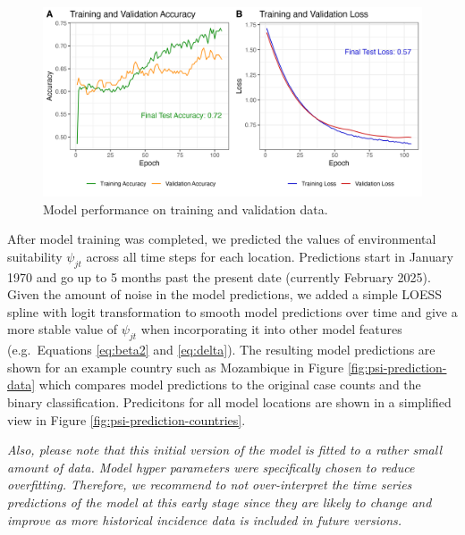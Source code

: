\documentclass[
]{book}
\begin{document}
\begin{figure}

{\centering \includegraphics[width=1\linewidth]{figures/suitability_LSTM_fit} 

}

\caption{Model performance on training and validation data.}\label{fig:lstm-model-fit}
\end{figure}

After model training was completed, we predicted the values of environmental suitability \(\psi_{jt}\) across all time steps for each location. Predictions start in January 1970 and go up to 5 months past the present date (currently February 2025). Given the amount of noise in the model predictions, we added a simple LOESS spline with logit transformation to smooth model predictions over time and give a more stable value of \(\psi_{jt}\) when incorporating it into other model features (e.g.~Equations \eqref{eq:beta2} and \eqref{eq:delta}). The resulting model predictions are shown for an example country such as Mozambique in Figure \ref{fig:psi-prediction-data} which compares model predictions to the original case counts and the binary classification. Predicitons for all model locations are shown in a simplified view in Figure \ref{fig:psi-prediction-countries}.

\emph{Also, please note that this initial version of the model is fitted to a rather small amount of data. Model hyper parameters were specifically chosen to reduce overfitting. Therefore, we recommend to not over-interpret the time series predictions of the model at this early stage since they are likely to change and improve as more historical incidence data is included in future versions.}
\end{document}
